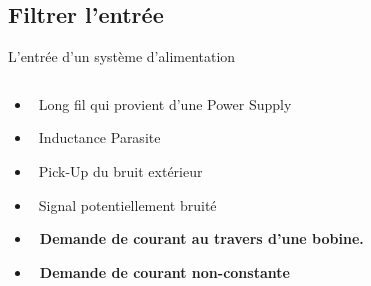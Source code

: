 \subsection{Filtrer l'entrée}
\begin{frame}{L'entrée d'un système d'alimentation}
    \begin{columns}
        \begin{column}{0.66\textwidth}
            \begin{itemize}
                \item[] \textcolor{UDSgreenFierte}{\faRoute} 
                    ~Long fil qui provient d'une Power Supply
                \item[] \textcolor{UDSgreenFierte}{\faSync} 
                    ~Inductance Parasite
                \bigskip
                \item[] \textcolor{UDSgreenFierte}{\faSatelliteDish}
                    ~Pick-Up du bruit extérieur 
                \item[] \textcolor{UDSgreenFierte}{\faSignature}
                    ~Signal potentiellement bruité
                \bigskip
                \item[] \textcolor{UDSgreenFierte}{\faLongArrowAltRight}
                \textbf{~Demande de courant au travers d'une bobine.}
                \item[] \textcolor{UDSgreenFierte}{\faWaveSquare}
                \textbf{~Demande de courant non-constante}
            \end{itemize}
        \end{column}
        \begin{column}{0.33\textwidth}
            \begin{figure}
                \centering

\end{figure}
\end{column}
\end{columns}
\end{frame}
